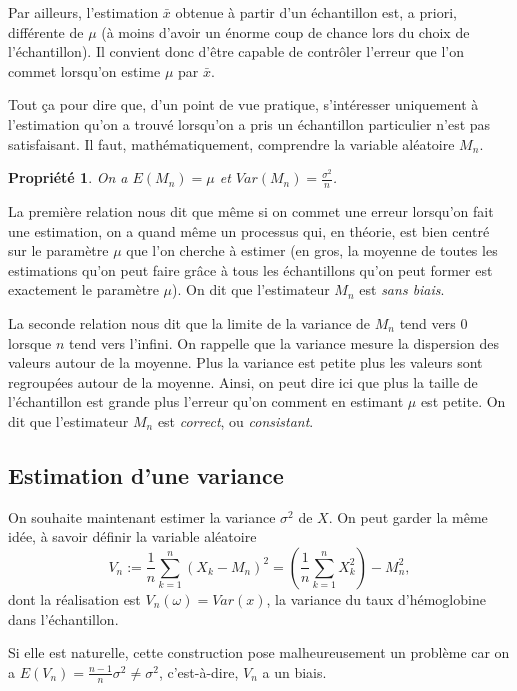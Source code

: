 \documentclass[12pt, a4paper]{book}
\newtheorem{prop}[thm]{Propriété}
\numberwithin{equation}{section}
\begin{document}
Par ailleurs, l'estimation $\bar{x}$ obtenue à partir d'un échantillon est, a priori, différente de $\mu$ (à moins d'avoir un énorme coup de chance lors du choix de l'échantillon). Il convient donc d'être capable
de contrôler l'erreur que l'on commet lorsqu'on estime $\mu$ par $\bar{x}$. 

Tout ça pour dire que, d'un point de vue pratique, s'intéresser uniquement à l'estimation qu'on a trouvé 
lorsqu'on a pris un échantillon particulier n'est pas satisfaisant. Il faut, mathématiquement, comprendre 
la variable aléatoire $M_n$.

\begin{prop}
On a  $E(M_n) = \mu$ et $Var(M_n) = \frac{\sigma^2}{n}$.
\end{prop}

La première relation nous dit que même si on commet une erreur lorsqu'on fait une estimation, on a quand même
un processus qui, en théorie, est bien centré sur le paramètre $\mu$ que l'on cherche à estimer (en gros, la moyenne de toutes les estimations qu'on peut faire gr\^ace à tous les échantillons qu'on peut former est exactement le paramètre $\mu$). On dit que l'estimateur $M_n$ est {\it sans biais}. 

La seconde relation nous dit que la limite de la variance de $M_n$ tend vers 0 lorsque $n$ tend vers l'infini.
On rappelle que la variance mesure la dispersion des valeurs autour de la moyenne. Plus la variance est petite plus les valeurs sont regroupées autour de la moyenne. Ainsi, on peut dire ici que plus la taille
de l'échantillon est grande plus l'erreur qu'on comment en estimant $\mu$ est petite. On dit que
l'estimateur $M_n$ est \emph{correct}, ou \emph{consistant}.

\subsection{Estimation d'une variance}

On souhaite maintenant estimer la variance $\sigma^2$ de $X$.
On peut garder la même idée, à savoir définir la variable aléatoire 
\[ V_n := \frac{1}{n} \sum_{k=1}^n (X_k - M_n)^2 = \left( \frac{1}{n} \sum_{k=1}^n X_k^2 \right) - M_n^2, \]
dont la réalisation est $V_n(\omega) = Var(x)$, la variance du taux d'hémoglobine dans l'échantillon.

Si elle est naturelle, cette construction pose malheureusement un problème car on a 
$\displaystyle E(V_n) = \frac{n-1}{n} \sigma^2 \neq \sigma^2$, c'est-à-dire, $V_n$ a un biais.
\end{document}
